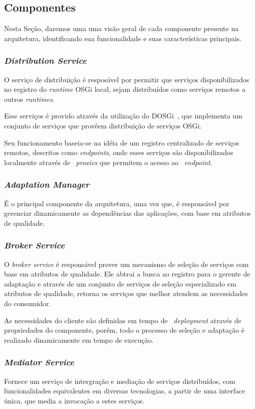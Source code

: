 \subsection{Componentes}
Nesta Seção, daremos uma uma visão geral de cada componente presente na arquitetura, identificando sua funcionalidade e suas características principais.

\subsubsection{\textit{Distribution Service}}
O serviço de distribuição é resposável por permitir que serviços disponibilizados no registro do \textit{runtime} OSGi local, sejam distribuídos como serviços remotos a outros \textit{runtimes}.

Esse serviços é provido através da utilização do DOSGi~\cite{dosgi}, que implementa um conjunto de serviços que provêem distribuição de serviços OSGi. 

Seu funcionamento baseia-se na idéia de um registro centralizado de serviços remotos, descritos como \textit{endpoints}, onde esses serviços são disponibilizados localmente através de ~\textit{proxies} que permitem o acesso ao ~\textit{endpoint}.

\subsubsection{\textit{Adaptation Manager}}
É o principal componente da arquitetura, uma vez que, é responsável por gerenciar dinamicamente as dependências das aplicações, com base em atributos de qualidade. %

\subsubsection{\textit{Broker Service}}
O \textit{broker service} é responsável prover um mecanismo de seleção de serviços com base em atributos de qualidade. Ele abtrai a busca ao registro para o gerente de adaptação e através de um conjunto de serviços de seleção especializado em atributos de qualidade, retorna os serviços que melhor atendem as necessidades do consumidor.

As necessidades do cliente são definidas em tempo de ~\textit{deployment} através de propriedades do componente, porém, todo o processo de seleção e adaptação é realizado dinamicamente em tempo de execução. 


\subsubsection{\textit{Mediator Service}}
Fornece um serviço de intergração e mediação de serviços distribuídos, com funcionalidades equivalentes em diversas tecnologias, a partir de uma interface única, que media a invocação a estes serviços. 


